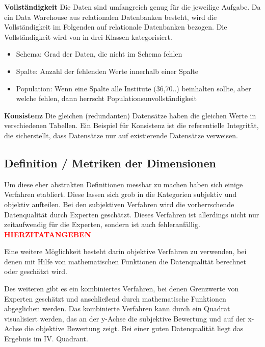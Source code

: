 \textbf{Vollständigkeit}
Die Daten sind umfangreich genug für die jeweilige Aufgabe. \cite{wang1996} 
Da ein Data Warehouse aus relationalen Datenbanken besteht, wird die Vollständigkeit im Folgenden auf relationale Datenbanken bezogen.
Die Vollständigkeit wird von \cite{pipino2002} in drei Klassen kategorisiert.
\begin{itemize}
 \item Schema: Grad der Daten, die nicht im Schema fehlen
 \item Spalte: Anzahl der fehlenden Werte innerhalb einer Spalte
 \item Population: Wenn eine Spalte alle Institute (36,70..) beinhalten sollte, aber welche fehlen, dann herrscht Populationsunvollständigkeit
\end{itemize}
\textbf{Konsistenz}
Die gleichen (redundanten) Datensätze haben die gleichen Werte in verschiedenen Tabellen. 
Ein Beispiel für Konsistenz ist die referentielle Integrität, die sicherstellt, dass Datensätze nur auf existierende Datensätze verweisen.
\\ %


\subsection{Definition / Metriken der Dimensionen}
Um diese eher abstrakten Definitionen messbar zu machen haben sich einige Verfahren etabliert.
Diese lassen sich grob in die Kategorien subjektiv und objektiv aufteilen. \cite{pipino2002}
Bei den subjektiven Verfahren wird die vorherrschende Datenqualität durch Experten geschätzt. 
Dieses Verfahren ist allerdings nicht nur zeitaufwendig für die Experten, sondern ist auch fehleranfällig. \textcolor{red}{\textbf{HIERZITATANGEBEN}} \cite{}

Eine weitere Möglichkeit besteht darin objektive Verfahren zu verwenden, bei denen mit Hilfe von mathematischen Funktionen die Datenqualität berechnet oder geschätzt wird. 

Des weiteren gibt es ein kombiniertes Verfahren, bei denen Grenzwerte von Experten geschätzt und anschließend durch mathematische Funktionen abgeglichen werden. 
Das kombinierte Verfahren kann durch ein Quadrat visualisiert werden, das an der y-Achse die subjektive Bewertung und auf der x-Achse die objektive Bewertung zeigt. 
Bei einer guten Datenqualität liegt das Ergebnis im IV. Quadrant. \cite{pipino2002}

